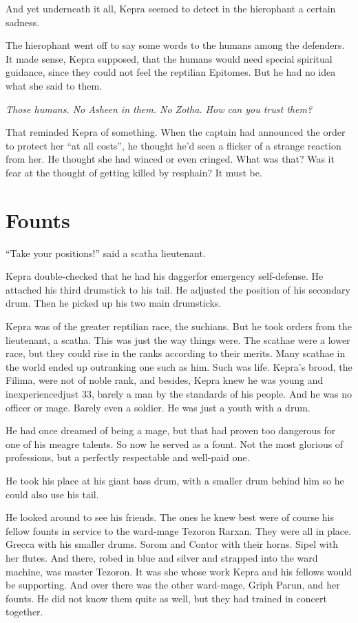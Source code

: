 \documentclass
  [a4paper,
   12pt,
   oneside
  ]%
  {article}
\begin{document}
And yet underneath it all, Kepra seemed to detect in the hierophant a certain sadness.

The hierophant went off to say some words to the humans among the defenders. 
It made sense, Kepra supposed, that the humans would need special spiritual guidance, since they could not feel the reptilian Epitomes. But he had no idea what she said to them.

\emph{Those humans. No Asheen in them. No Zotha. How can you trust them?}

That reminded Kepra of something. 
When the captain had announced the order to protect her ``at all costs'', he thought he'd seen a flicker of a strange reaction from her. 
He thought she had winced or even cringed. 
What was that? 
Was it fear at the thought of getting killed by resphain? 
It must be.



\section{Founts}
``Take your positions!'' said a scatha lieutenant. 

Kepra double-checked that he had his dagger\dash{}for emergency self-defense. 
He attached his third drumstick to his tail. 
He adjusted the position of his secondary drum. 
Then he picked up his two main drumsticks.

Kepra was of the greater reptilian race, the suchians. 
But he took orders from the lieutenant, a scatha. 
This was just the way things were. 
The scathae were a lower race, but they could rise in the ranks according to their merits. 
Many scathae in the world ended up outranking one such as him.
Such was life.
Kepra’s brood, the Filima, were not of noble rank, and besides, Kepra knew he was young and inexperienced\dash{}just 33, barely a man by the standards of his people. 
And he was no officer or mage. 
Barely even a soldier. 
He was just a youth with a drum. 

He had once dreamed of being a mage, but that had proven too dangerous for one of his meagre talents. 
So now he served as a fount. Not the most glorious of professions, but a perfectly respectable and well-paid one.

He took his place at his giant bass drum, with a smaller drum behind him so he could also use his tail. 

He looked around to see his friends. 
The ones he knew best were of course his fellow founts in service to the ward-mage Tezoron Rarxan. 
They were all in place. Grecca with his smaller drums. Sorom and Contor with their horns. Sipel with her flutes. 
And there, robed in blue and silver and strapped into the ward machine, was master Tezoron. 
It was she whose work Kepra and his fellows would be supporting. And over there was the other ward-mage, Griph Parun, and her founts. He did not know them quite as well, but they had trained in concert together. 
\end{document}
